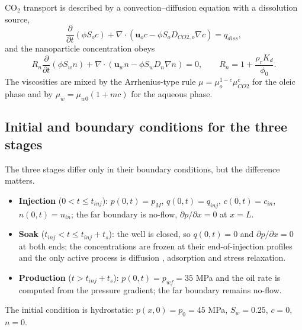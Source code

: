 \documentclass{swmcmthesis}
\begin{document}
CO$_2$ transport is described by a convection--diffusion \cite{crank} equation with a dissolution source,
\begin{equation}
\frac{\partial}{\partial t}\left(\phi S_o c\right)+\nabla\cdot\left(\mathbf{u}_o c-\phi S_o D_{CO2,o}\nabla c\right)=q_{diss},
\label{eq:co2}
\end{equation}
and the nanoparticle concentration obeys
\begin{equation}
R_n\frac{\partial}{\partial t}\left(\phi S_w n\right)+\nabla\cdot\left(\mathbf{u}_w n-\phi S_w D_n\nabla n\right)=0,\qquad R_n=1+\frac{\rho_r K_d}{\phi_0}.
\label{eq:nano}
\end{equation}
The viscosities are mixed by the Arrhenius-type rule $\mu=\mu_o^{1-c}\mu_{CO2}^{c}$ for the oleic phase and by $\mu_w=\mu_{w0}(1+mc)$ for the aqueous phase.

\subsection{Initial and boundary conditions for the three stages}
The three stages differ only in their boundary conditions, but the difference matters.
\begin{itemize}[leftmargin=2em,itemsep=2pt]
\item \textbf{Injection} ($0<t\le t_{inj}$): $p(0,t)=p_{M}$, $q(0,t)=q_{inj}$, $c(0,t)=c_{in}$, $n(0,t)=n_{in}$; the far boundary is no-flow, $\partial p/\partial x=0$ at $x=L$.
\item \textbf{Soak} ($t_{inj}<t\le t_{inj}+t_s$): the well is closed, so $q(0,t)=0$ and $\partial p/\partial x=0$ at both ends; the concentrations are frozen at their end-of-injection profiles and the only active process is diffusion \cite{crank}, adsorption and stress relaxation.
\item \textbf{Production} ($t>t_{inj}+t_s$): $p(0,t)=p_{wf}=35$ MPa and the oil rate is computed from the pressure gradient; the far boundary remains no-flow.
\end{itemize}
The initial condition is hydrostatic: $p(x,0)=p_0=45$ MPa, $S_w=0.25$, $c=0$, $n=0$.
\end{document}
